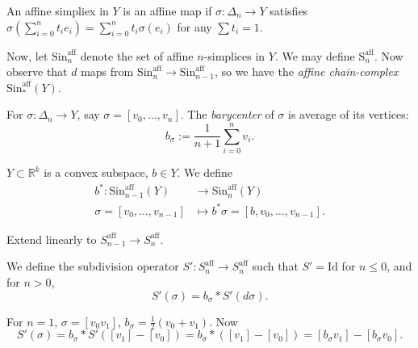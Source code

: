 
\begin{definition}
	\label{defn:AffineMap}
	An affine simpliex in $Y$ is an affine map if $\sigma: \Delta_n \to  Y$ satisfies $\sigma\left( \sum_{i = 0}^n t_i e_i \right)  = \sum_{i = 0}^n t_i \sigma(e_i)$ for any $\sum t_i = 1$.
\end{definition}

Now, let $\text{Sin}^{\text{aff}}_n$ denote the set of affine $n$-simplices in $Y$. We may define $\text{S}^{\text{aff}}_n$. Now observe that  $d$ maps from $\text{Sin}^{\text{aff}}_n \to \text{Sin}^{\text{aff}}_{n - 1}$, so we have the  \textit{affine chain-complex} $\text{Sin}^{\text{aff}}_*(Y) $. 


 \begin{definition}[Barycenter]
	\label{defn:Barycenter}
	For $\sigma: \Delta_n \to Y$, say $\sigma = [v_0, \ldots, v_n]$. The \textit{barycenter} of $\sigma$ is average of its vertices:
	\[
		b_\sigma := \frac{1}{n + 1} \sum_{i = 0}^n v_i
	.\] 
\end{definition}

\begin{definition}
	\label{defn:ConeConstruction}
	$Y \subset \mathbb{R}^k$ is a convex subspace, $b \in Y$. We define
	\begin{align*}
		b^*: \text{Sin}^{\text{aff}}_{n - 1}(Y) &\longrightarrow \text{Sin}^{\text{aff}}_n(Y) \\
	\sigma = [v_0, \ldots, v_{n - 1}] &\longmapsto b^*\sigma = [b, v_0, \ldots, v_{n - 1}]
.\end{align*}

Extend linearly to  $S^{\text{aff}}_{n - 1} \to S^{\text{aff}}_{n }$.
\end{definition}

\begin{definition}[Subdivision]
	\label{defn:Subdivision}
	We define the subdivision operator $S':S^{\text{aff}}_{n } \to S^{\text{aff}}_{n }$ such that $S' = \text{Id}$ for $n \le 0$, and for $n > 0$,
	\[
		S'(\sigma) = b_\sigma * S'(d \sigma)
	.\] 
\end{definition}

\begin{example}
	For $n = 1$, $\sigma = [v_0 v_1]$, $b_\sigma = \frac{1}{2}(v_0 + v_1)$. Now
	\[
		S'(\sigma) = b_\sigma * S'([v_1] - [v_0]) = b_\sigma* ([v_1] - [v_0]) = [b_\sigma v_1] - [b_\sigma v_0]
	.\] 
\end{example}


